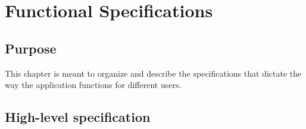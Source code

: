 \chapter{Functional Specifications}
\label{ch:func}

\newenvironment{specifications}{\newcommand*\spec{\addtocounter{specid}{10}\item[FS\thespecid]}\begin{itemize}}{\end{itemize}}

\section{Purpose}

This chapter is meant to organize and describe the specifications that dictate the way the application functions for different users.

\section{High-level specification}

